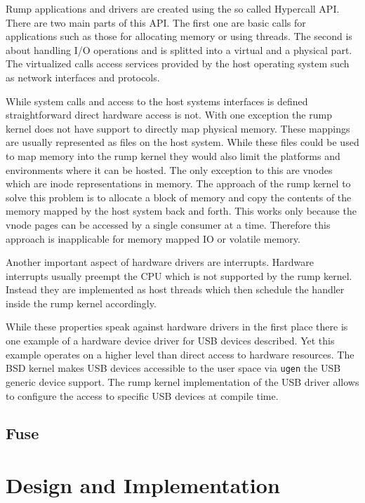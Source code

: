 \documentclass[
a4paper,
12pt,
notitlepage,
parskip=half,
DIV=11,
]{scrbook}
\begin{document}
		Rump applications and drivers are created using the so called Hypercall API.
		There are two main parts of this API.
		The first one are basic calls for applications such as those for allocating memory or using threads.
		The second is about handling I/O operations and is splitted into a virtual and a physical part.
		The virtualized calls access services provided by the host operating system such as network interfaces and protocols. \citep{rump_man} \citep{rump_platform}
		
		While system calls and access to the host systems interfaces is defined straightforward direct hardware access is not.
		With one exception the rump kernel does not have support to directly map physical memory.
		These mappings are usually represented as files on the host system.
		While these files could be used to map memory into the rump kernel they would also limit the platforms and environments where it can be hosted.
		The only exception to this are vnodes which are inode representations in memory.
		The approach of the rump kernel to solve this problem is to allocate a block of memory and copy the contents of the memory mapped by the host system back and forth.
		This works only because the vnode pages can be accessed by a single consumer at a time.
		Therefore this approach is inapplicable for memory mapped IO or volatile memory. \citep{kantee}
		
		Another important aspect of hardware drivers are interrupts.
		Hardware interrupts usually preempt the CPU which is not supported by the rump kernel.
		Instead they are implemented as host threads which then schedule the handler inside the rump kernel accordingly. \citep{kantee}
		
		While these properties speak against hardware drivers in the first place there is one example of a hardware device driver for USB devices described.
		Yet this example operates on a higher level than direct access to hardware resources.
		The BSD kernel makes USB devices accessible to the user space via \texttt{ugen} the USB generic device support.
		The rump kernel implementation of the USB driver allows to configure the access to specific USB devices at compile time. \citep{kantee} \citep{ugen}
		
		\section{Fuse}
	
	\chapter{Design and Implementation}
	
\end{document}

